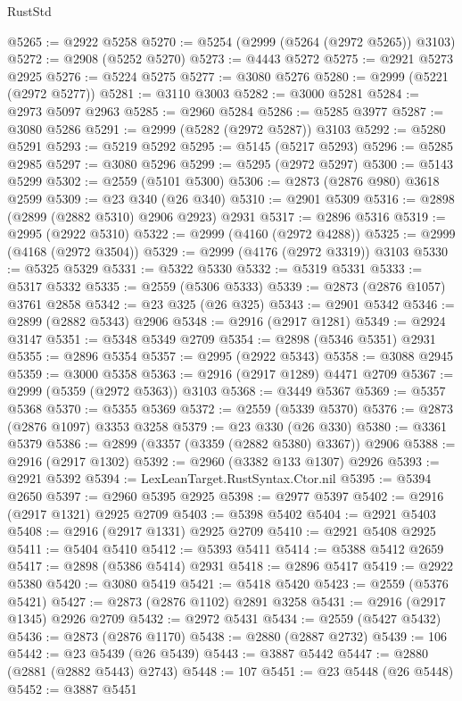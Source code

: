 \begin{lexlean}{RustStd}
\begin{coremodule}
@5265 := @2922 @5258
@5270 := @5254 (@2999 (@5264 (@2972 @5265)) @3103)
@5272 := @2908 (@5252 @5270)
@5273 := @4443 @5272
@5275 := @2921 @5273 @2925
@5276 := @5224 @5275
@5277 := @3080 @5276
@5280 := @2999 (@5221 (@2972 @5277))
@5281 := @3110 @3003
@5282 := @3000 @5281
@5284 := @2973 @5097 @2963
@5285 := @2960 @5284
@5286 := @5285 @3977
@5287 := @3080 @5286
@5291 := @2999 (@5282 (@2972 @5287)) @3103
@5292 := @5280 @5291
@5293 := @5219 @5292
@5295 := @5145 (@5217 @5293)
@5296 := @5285 @2985
@5297 := @3080 @5296
@5299 := @5295 (@2972 @5297)
@5300 := @5143 @5299
@5302 := @2559 (@5101 @5300)
@5306 := @2873 (@2876 @980) @3618 @2599
@5309 := @23 @340 (@26 @340)
@5310 := @2901 @5309
@5316 := @2898 (@2899 (@2882 @5310) @2906 @2923) @2931
@5317 := @2896 @5316
@5319 := @2995 (@2922 @5310)
@5322 := @2999 (@4160 (@2972 @4288))
@5325 := @2999 (@4168 (@2972 @3504))
@5329 := @2999 (@4176 (@2972 @3319)) @3103
@5330 := @5325 @5329
@5331 := @5322 @5330
@5332 := @5319 @5331
@5333 := @5317 @5332
@5335 := @2559 (@5306 @5333)
@5339 := @2873 (@2876 @1057) @3761 @2858
@5342 := @23 @325 (@26 @325)
@5343 := @2901 @5342
@5346 := @2899 (@2882 @5343) @2906
@5348 := @2916 (@2917 @1281)
@5349 := @2924 @3147
@5351 := @5348 @5349 @2709
@5354 := @2898 (@5346 @5351) @2931
@5355 := @2896 @5354
@5357 := @2995 (@2922 @5343)
@5358 := @3088 @2945
@5359 := @3000 @5358
@5363 := @2916 (@2917 @1289) @4471 @2709
@5367 := @2999 (@5359 (@2972 @5363)) @3103
@5368 := @3449 @5367
@5369 := @5357 @5368
@5370 := @5355 @5369
@5372 := @2559 (@5339 @5370)
@5376 := @2873 (@2876 @1097) @3353 @3258
@5379 := @23 @330 (@26 @330)
@5380 := @3361 @5379
@5386 := @2899 (@3357 (@3359 (@2882 @5380) @3367)) @2906
@5388 := @2916 (@2917 @1302)
@5392 := @2960 (@3382 @133 @1307) @2926
@5393 := @2921 @5392
@5394 := LexLeanTarget.RustSyntax.Ctor.nil
@5395 := @5394 @2650
@5397 := @2960 @5395 @2925
@5398 := @2977 @5397
@5402 := @2916 (@2917 @1321) @2925 @2709
@5403 := @5398 @5402
@5404 := @2921 @5403
@5408 := @2916 (@2917 @1331) @2925 @2709
@5410 := @2921 @5408 @2925
@5411 := @5404 @5410
@5412 := @5393 @5411
@5414 := @5388 @5412 @2659
@5417 := @2898 (@5386 @5414) @2931
@5418 := @2896 @5417
@5419 := @2922 @5380
@5420 := @3080 @5419
@5421 := @5418 @5420
@5423 := @2559 (@5376 @5421)
@5427 := @2873 (@2876 @1102) @2891 @3258
@5431 := @2916 (@2917 @1345) @2926 @2709
@5432 := @2972 @5431
@5434 := @2559 (@5427 @5432)
@5436 := @2873 (@2876 @1170)
@5438 := @2880 (@2887 @2732)
@5439 := 106
@5442 := @23 @5439 (@26 @5439)
@5443 := @3887 @5442
@5447 := @2880 (@2881 (@2882 @5443) @2743)
@5448 := 107
@5451 := @23 @5448 (@26 @5448)
@5452 := @3887 @5451

\end{coremodule}
\end{lexlean}
